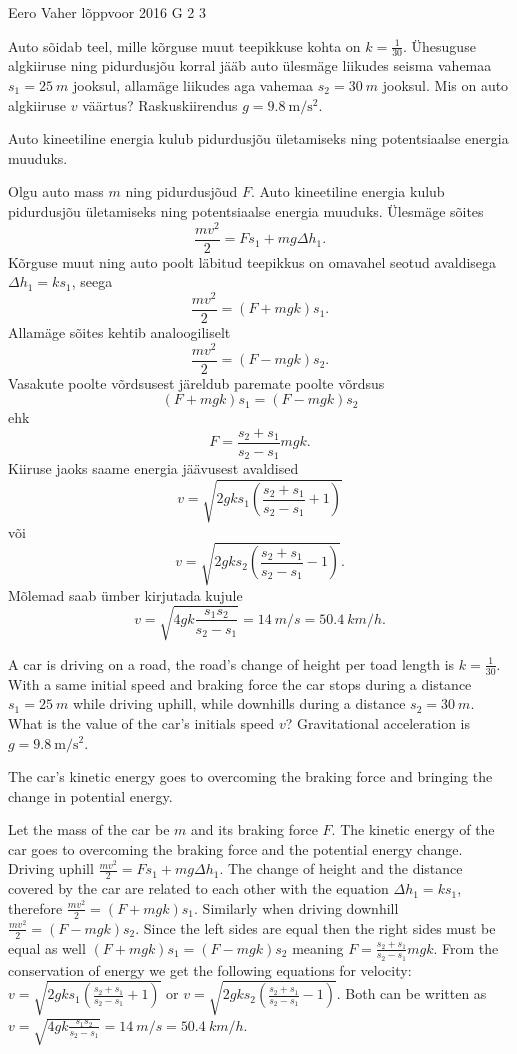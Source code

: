 {Eero Vaher} %
{lõppvoor} %
{2016} %
{G 2} %
{3} %
{
\ifStatement
Auto sõidab teel, mille kõrguse muut teepikkuse kohta on $k=\frac{1}{30}$. Ühesuguse algkiiruse ning pidurdusjõu korral jääb auto ülesmäge liikudes seisma vahemaa $s_1=\SI{25}{m}$ jooksul, allamäge liikudes aga vahemaa $s_2=\SI{30}{m}$ jooksul. Mis on auto algkiiruse $v$ väärtus? Raskuskiirendus $g=\SI{9.8}{\meter\per\second\squared}$.
\fi


\ifHint
Auto kineetiline energia kulub pidurdusjõu ületamiseks ning potentsiaalse energia muuduks.
\fi


\ifSolution
Olgu auto mass $m$ ning pidurdusjõud $F$. Auto kineetiline energia kulub pidurdusjõu ületamiseks ning potentsiaalse energia muuduks. Ülesmäge sõites
\[
\frac{mv^2}{2}=Fs_1+mg\Delta h_1.
\]
Kõrguse muut ning auto poolt läbitud teepikkus on omavahel seotud avaldisega $\Delta h_1=ks_1$, seega
\[
\frac{mv^2}{2}=\left(F+mgk\right)s_1.
\]
Allamäge sõites kehtib analoogiliselt
\[
\frac{mv^2}{2}=\left(F-mgk\right)s_2.
\]
Vasakute poolte võrdsusest järeldub paremate poolte võrdsus 
\[
\left(F+mgk\right)s_1=\left(F-mgk\right)s_2
\]
ehk
\[
F=\frac{s_2+s_1}{s_2-s_1}mgk.
\]
Kiiruse jaoks saame energia jäävusest avaldised 
\[
v=\sqrt{2gks_1\left(\frac{s_2+s_1}{s_2-s_1}+1\right)}
\]
või
\[
v=\sqrt{2gks_2\left(\frac{s_2+s_1}{s_2-s_1}-1\right)}.
\]
Mõlemad saab ümber kirjutada kujule 
\[
v=\sqrt{4gk\frac{s_1s_2}{s_2-s_1}}=\SI{14}{m \per s}=\SI{50.4}{km \per h}.
\]
\fi


\ifEngStatement
A car is driving on a road, the road’s change of height per toad length is $k=\frac{1}{30}$. With a same initial speed and braking force the car stops during a distance $s_1=\SI{25}{m}$ while driving uphill, while downhills during a distance $s_2=\SI{30}{m}$. What is the value of the car’s initials speed $v$? Gravitational acceleration is $g=\SI{9.8}{\meter\per\second\squared}$.
\fi


\ifEngHint
The car’s kinetic energy goes to overcoming the braking force and bringing the change in potential energy.
\fi


\ifEngSolution
Let the mass of the car be $m$ and its braking force $F$. The kinetic energy of the car goes to overcoming the braking force and the potential energy change. Driving uphill $\frac{mv^2}{2}=Fs_1+mg\Delta h_1$. The change of height and the distance covered by the car are related to each other with the equation $\Delta h_1=ks_1$, therefore $\frac{mv^2}{2}=\left(F+mgk\right)s_1$. Similarly when driving downhill $\frac{mv^2}{2}=\left(F-mgk\right)s_2$. Since the left sides are equal then the right sides must be equal as well $\left(F+mgk\right)s_1=\left(F-mgk\right)s_2$ meaning $F=\frac{s_2+s_1}{s_2-s_1}mgk$. From the conservation of energy we get the following equations for velocity: $v=\sqrt{2gks_1\left(\frac{s_2+s_1}{s_2-s_1}+1\right)}$ or $v=\sqrt{2gks_2\left(\frac{s_2+s_1}{s_2-s_1}-1\right)}$. Both can be written as $v=\sqrt{4gk\frac{s_1s_2}{s_2-s_1}}=\SI{14}{m \per s}=\SI{50.4}{km \per h}$.
\fi
}